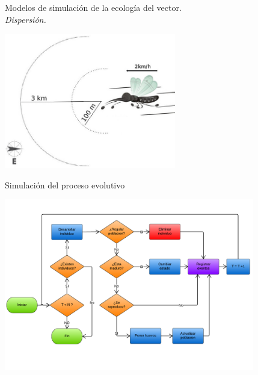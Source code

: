 \begin{frame}[t]{Modelos de simulación de la ecología del vector.\\\textit{Dispersión.}}
  \begin{center}
    \includegraphics[width=7.5cm]{./graphics/dispersion.jpg}
  \end{center}
\end{frame}

\begin{frame}[c]{Simulación del proceso evolutivo}
  \begin{center}
    \includegraphics[height=7.5cm]{./graphics/algoritmo-propuesto.png}
  \end{center}
\end{frame}

